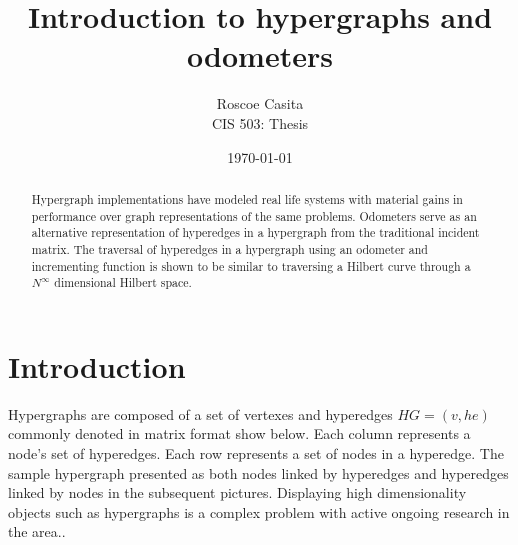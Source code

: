 \documentclass[12pt]{article}
\title{Introduction to hypergraphs and odometers}
\author{
        Roscoe Casita \\
        CIS 503: Thesis\\
}
\date{\today}
\begin{document}
\maketitle

\begin{abstract}
Hypergraph implementations have modeled real life systems with material gains in performance over graph representations of the same problems. Odometers serve as an alternative representation of hyperedges in a hypergraph from the traditional incident matrix. The traversal of hyperedges in a hypergraph using an odometer and incrementing function is shown to be similar to traversing a Hilbert curve through a $N^\infty$ dimensional Hilbert space.
\end{abstract}

\section{Introduction}
Hypergraphs are composed of a set of vertexes and hyperedges $HG = (v, he)$ commonly denoted in matrix format show below. Each column represents a node’s set of hyperedges. Each row represents a set of nodes in a hyperedge. The sample hypergraph presented as both nodes linked by hyperedges and hyperedges linked by nodes in the subsequent pictures. Displaying high dimensionality objects such as hypergraphs is a complex problem with active ongoing research in the area..
\end{document}
